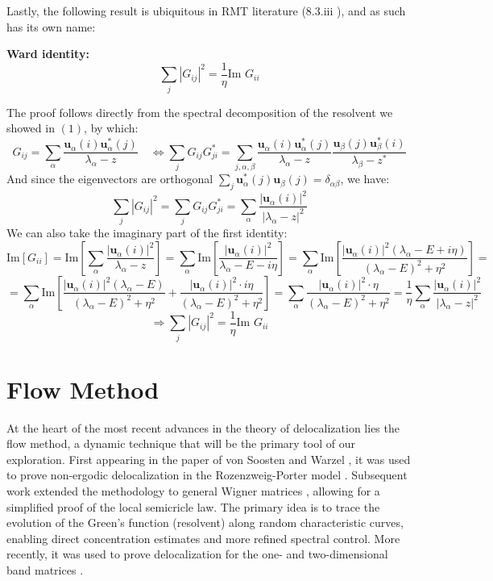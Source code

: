 \documentclass[11pt]{article}
\newenvironment{boxtheorem}[1]
  {\begin{mdframed}\noindent\textbf{#1}\itshape\space}
  {\end{mdframed}}
\newcommand{\im}{\text{Im }}
\begin{document}
\noindent Lastly, the following result is ubiquitous in RMT literature (8.3.iii \cite{dynamic}), and as such has its own name: 
\begin{boxtheorem}{Ward identity: }\label{ward} $$\sum_j |G_{ij}|^2 = \frac{1}{\eta}\im G_{ii}$$\end{boxtheorem}
The proof follows directly from the spectral decomposition of the resolvent we showed in $(1)$, by which:
$$G_{ij} = \sum_{\alpha} \frac{\mathbf{u}_\alpha(i) \mathbf{u}_\alpha^*(j)}{\lambda_\alpha - z}\quad \Leftrightarrow \sum_j G_{ij} G_{ji}^* = \sum_{j, \alpha, \beta}\frac{\mathbf{u}_\alpha(i) \mathbf{u}_\alpha^*(j)}{\lambda_\alpha - z} \frac{\mathbf{u}_\beta(j) \mathbf{u}_\beta^*(i)}{\lambda_\beta - z^*}
$$
And since the eigenvectors are orthogonal $\sum_j \mathbf{u}_\alpha^*(j) \mathbf{u}_\beta(j) = \delta_{\alpha\beta}$, we have: $$\sum_j |G_{ij}|^2=\sum_j G_{ij} G_{ji}^* = \sum_\alpha \frac{|\mathbf{u}_\alpha(i)|^2}{|\lambda_\alpha - z|^2}$$ 
We can also take the imaginary part of the first identity:
$$\text{Im}[G_{ii}] = \text{Im}\left[\sum_\alpha \frac{|\mathbf{u}_\alpha(i)|^2}{\lambda_\alpha - z}\right]
= \sum_\alpha \text{Im}\left[\frac{|\mathbf{u}_\alpha(i)|^2}{\lambda_\alpha - E - i\eta}\right]=\sum_\alpha \text{Im}\left[\frac{|\mathbf{u}_\alpha(i)|^2(\lambda_\alpha - E + i\eta)}{(\lambda_\alpha - E)^2 + \eta^2}\right]= $$
$$= \sum_\alpha \text{Im}\left[\frac{|\mathbf{u}_\alpha(i)|^2(\lambda_\alpha - E)}{(\lambda_\alpha - E)^2 + \eta^2} + \frac{|\mathbf{u}_\alpha(i)|^2 \cdot i\eta}{(\lambda_\alpha - E)^2 + \eta^2}\right] 
= \sum_\alpha \frac{|\mathbf{u}_\alpha(i)|^2 \cdot \eta}{(\lambda_\alpha - E)^2 + \eta^2} = \frac{1}{\eta} \sum_\alpha \frac{|\mathbf{u}_\alpha(i)|^2}{|\lambda_\alpha - z|^2}$$
$$\Rightarrow \sum_j |G_{ij}|^2 = \frac{1}{\eta}\im G_{ii}$$




\newpage
\section{Flow Method}
\label{sec:flow}
At the heart of the most recent advances in the theory of delocalization lies the flow method, a dynamic technique that will be the primary tool of our exploration. First appearing in the paper of von Soosten and Warzel \cite{RP}, it was used to prove non-ergodic delocalization in the Rozenzweig-Porter model \cite{porter1960}. Subsequent work \cite{soosten} extended the methodology to general Wigner matrices \cite{dynamic}, allowing for a simplified proof of the local semicricle law. The primary idea is to trace the evolution of the Green's function (resolvent) along random characteristic curves, enabling direct concentration estimates and more refined spectral control. More recently, it was used to prove delocalization for the one- and two-dimensional band matrices \cite{yauyin, twodim}\vspace{0.25cm}.
\end{document}
